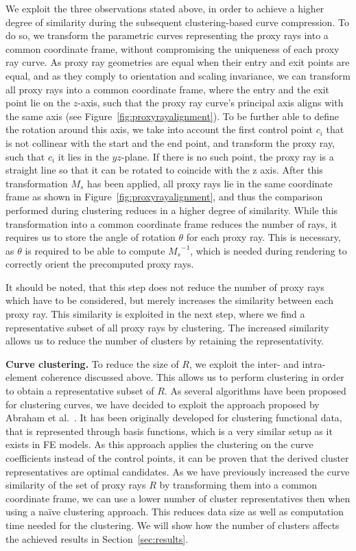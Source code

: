 \documentclass[journal]{vgtc}                %
\begin{document}
We exploit the three observations stated above, in order to achieve a higher degree of similarity during the subsequent clustering-based curve compression. To do so, we transform the parametric curves representing the proxy rays into a common coordinate frame, without compromising the uniqueness of each proxy ray curve. As proxy ray geometries are equal when their entry and exit points are equal, and as they comply to orientation and scaling invariance, we can transform all proxy rays into a common coordinate frame, where the entry and the exit point lie on the $z$-axis, such that the proxy ray curve's principal axis aligns with the same axis (see Figure~\ref{fig:proxyrayalignment}). To be further able to define the rotation around this axis, we take into account the first control point $c_i$ that is not collinear with the start and the end point, and transform the proxy ray, such that $c_i$ it lies in the $yz$-plane. If there is no such point, the proxy ray is a straight line so that it can be rotated to coincide with the z axis. After this transformation $M_s$ has been applied, all proxy rays lie in the same coordinate frame as shown in Figure~\ref{fig:proxyrayalignment}, and thus the comparison performed during clustering reduces in a higher degree of similarity. While this transformation into a common coordinate frame reduces the number of rays, it requires us to store the angle of rotation $\theta$ for each proxy ray. This is necessary, as $\theta$ is required to be able to compute ${M_s}^{-1}$, which is needed during rendering to correctly orient the precomputed proxy rays.

It should be noted, that this step does not reduce the number of proxy rays which have to be considered, but merely increases the similarity between each proxy ray. This similarity is exploited in the next step, where we find a representative subset of all proxy rays by clustering. The increased similarity allows us to reduce the number of clusters by retaining the representativity.

\noindent \textbf{Curve clustering.} To reduce the size of $R$, we exploit the inter- and intra-element coherence discussed above. This allows us to perform clustering in order to obtain a representative subset of $R$. As several algorithms have been proposed for clustering curves, we have decided to exploit the approach proposed by Abraham et al.~\cite{abraham03clustering}. It has been originally developed for clustering functional data, that is represented through basis functions, which is a very similar setup as it exists in FE models. As this approach applies the clustering on the curve coefficients instead of the control points, it can be proven that the derived cluster representatives are optimal candidates. As we have previously increased the curve similarity of the set of proxy rays $R$ by transforming them into a common coordinate frame, we can use a lower number of cluster representatives then when using a na\"ive clustering approach. This reduces data size as well as computation time needed for the clustering. We will show how the number of clusters affects the achieved results in Section~\ref{sec:results}.
\end{document}
